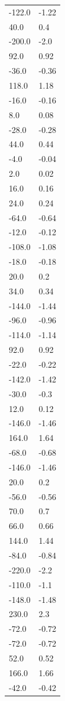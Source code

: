 \begin{longtable}{ll}
-122.0 & -1.22 \\
40.0 & 0.4 \\
-200.0 & -2.0 \\
92.0 & 0.92 \\
-36.0 & -0.36 \\
118.0 & 1.18 \\
-16.0 & -0.16 \\
8.0 & 0.08 \\
-28.0 & -0.28 \\
44.0 & 0.44 \\
-4.0 & -0.04 \\
2.0 & 0.02 \\
16.0 & 0.16 \\
24.0 & 0.24 \\
-64.0 & -0.64 \\
-12.0 & -0.12 \\
-108.0 & -1.08 \\
-18.0 & -0.18 \\
20.0 & 0.2 \\
34.0 & 0.34 \\
-144.0 & -1.44 \\
-96.0 & -0.96 \\
-114.0 & -1.14 \\
92.0 & 0.92 \\
-22.0 & -0.22 \\
-142.0 & -1.42 \\
-30.0 & -0.3 \\
12.0 & 0.12 \\
-146.0 & -1.46 \\
164.0 & 1.64 \\
-68.0 & -0.68 \\
-146.0 & -1.46 \\
20.0 & 0.2 \\
-56.0 & -0.56 \\
70.0 & 0.7 \\
66.0 & 0.66 \\
144.0 & 1.44 \\
-84.0 & -0.84 \\
-220.0 & -2.2 \\
-110.0 & -1.1 \\
-148.0 & -1.48 \\
230.0 & 2.3 \\
-72.0 & -0.72 \\
-72.0 & -0.72 \\
52.0 & 0.52 \\
166.0 & 1.66 \\
-42.0 & -0.42 \\

\end{longtable}
